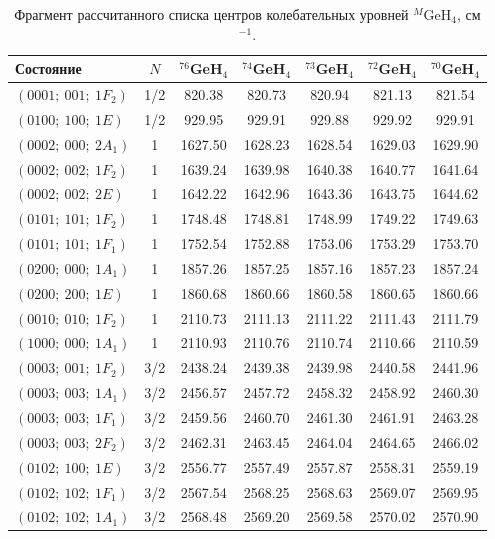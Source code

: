 \begin{table}[htbp]
\centering
\scriptsize
\caption{Фрагмент рассчитанного списка центров колебательных уровней ${}^{M}$GeH$_4$, см$^{-1}$.}
\label{tab:ge_predicted_band_centers_fragment}
\setlength{\tabcolsep}{3pt}
\begin{tabular}{lcccccc}
\toprule
Состояние & $N$ & ${}^{76}$GeH$_4$ & ${}^{74}$GeH$_4$ & ${}^{73}$GeH$_4$ & ${}^{72}$GeH$_4$ & ${}^{70}$GeH$_4$ \\
\midrule
$( 0 0 0 1;~   0 0 1;~   1 F_2  )$ & 1/2 & 820.38 & 820.73 & 820.94 & 821.13 & 821.54 \\
$( 0 1 0 0;~   1 0 0;~   1  E   )$ & 1/2 & 929.95 & 929.91 & 929.88 & 929.92 & 929.91 \\
$( 0 0 0 2;~   0 0 0;~   2 A_1  )$ & 1 & 1627.50 & 1628.23 & 1628.54 & 1629.03 & 1629.90 \\
$( 0 0 0 2;~   0 0 2;~   1 F_2  )$ & 1 & 1639.24 & 1639.98 & 1640.38 & 1640.77 & 1641.64 \\
$( 0 0 0 2;~   0 0 2;~   2  E   )$ & 1 & 1642.22 & 1642.96 & 1643.36 & 1643.75 & 1644.62 \\
$( 0 1 0 1;~   1 0 1;~   1 F_2  )$ & 1 & 1748.48 & 1748.81 & 1748.99 & 1749.22 & 1749.63 \\
$( 0 1 0 1;~   1 0 1;~   1 F_1  )$ & 1 & 1752.54 & 1752.88 & 1753.06 & 1753.29 & 1753.70 \\
$( 0 2 0 0;~   0 0 0;~   1 A_1  )$ & 1 & 1857.26 & 1857.25 & 1857.16 & 1857.23 & 1857.24 \\
$( 0 2 0 0;~   2 0 0;~   1  E   )$ & 1 & 1860.68 & 1860.66 & 1860.58 & 1860.65 & 1860.66 \\
$( 0 0 1 0;~   0 1 0;~   1 F_2  )$ & 1 & 2110.73 & 2111.13 & 2111.22 & 2111.43 & 2111.79 \\
$( 1 0 0 0;~   0 0 0;~   1 A_1  )$ & 1 & 2110.93 & 2110.76 & 2110.74 & 2110.66 & 2110.59 \\
$( 0 0 0 3;~   0 0 1;~   1 F_2  )$ & 3/2 & 2438.24 & 2439.38 & 2439.98 & 2440.58 & 2441.96 \\
$( 0 0 0 3;~   0 0 3;~   1 A_1  )$ & 3/2 & 2456.57 & 2457.72 & 2458.32 & 2458.92 & 2460.30 \\
$( 0 0 0 3;~   0 0 3;~   1 F_1  )$ & 3/2 & 2459.56 & 2460.70 & 2461.30 & 2461.91 & 2463.28 \\
$( 0 0 0 3;~   0 0 3;~   2 F_2  )$ & 3/2 & 2462.31 & 2463.45 & 2464.04 & 2464.65 & 2466.02 \\
$( 0 1 0 2;~   1 0 0;~   1  E   )$ & 3/2 & 2556.77 & 2557.49 & 2557.87 & 2558.31 & 2559.19 \\
$( 0 1 0 2;~   1 0 2;~   1 F_1  )$ & 3/2 & 2567.54 & 2568.25 & 2568.63 & 2569.07 & 2569.95 \\
$( 0 1 0 2;~   1 0 2;~   1 A_1  )$ & 3/2 & 2568.48 & 2569.20 & 2569.58 & 2570.02 & 2570.90 \\
\bottomrule
\end{tabular}
\end{table}
